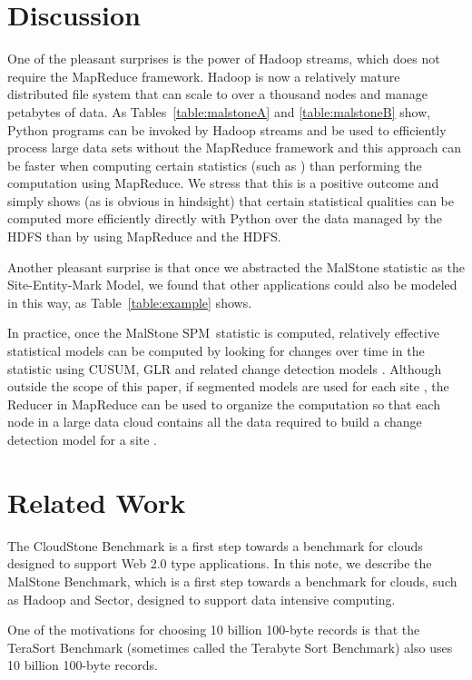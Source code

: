 \documentclass{acm_proc_article-sp}
\def\spm{\mbox{SPM}}
\def\malstone{MalStone } \def\malgen{MalGen }
\begin{document}
\vfill
\section{Discussion}

One of the pleasant surprises is the power of Hadoop streams, which
does not require the MapReduce framework. Hadoop is now a relatively
mature distributed file system that can scale to over a thousand nodes
and manage petabytes of data. As Tables~\ref{table:malstoneA} and
\ref{table:malstoneB} show, Python programs can be invoked by Hadoop
streams and be used to efficiently process large data sets without the
MapReduce framework and this approach can be faster when computing
certain statistics (such as ) than performing the
computation using MapReduce. We stress that this is a positive outcome
and simply shows (as is obvious in hindsight) that certain statistical
qualities can be computed more efficiently directly with Python over
the data managed by the HDFS than by using MapReduce and the HDFS.

Another pleasant surprise is that once we abstracted the \malstone
statistic as the Site-Entity-Mark Model, we found that other
applications could also be modeled in this way, as
Table~\ref{table:example} shows.

In practice, once the \malstone \spm\ statistic is computed,
relatively effective statistical models can be computed by looking
for changes over time  in the  statistic using CUSUM,
GLR and related change detection models
\cite{Poor:QuickestDetection2008}.  Although outside the scope of this
paper, if segmented models are used for each site , the Reducer in MapReduce 
can be used to organize the computation so that each node in a large
data cloud contains all the data required to build a change detection
model for a site  \cite{Grossman:Sawmill}.


\section{Related Work}


The CloudStone Benchmark \cite{Sobel:2008} is a first step towards a
benchmark for clouds designed to support Web 2.0 type applications. In
this note, we describe the \malstone Benchmark, which is a first step
towards a benchmark for clouds, such as Hadoop and Sector, designed to
support data intensive computing.

One of the motivations for choosing 10 billion 100-byte records is
that the TeraSort Benchmark \cite{Gray:TeraSort} (sometimes called the
Terabyte Sort Benchmark) also uses 10 billion 100-byte records.
\end{document}
